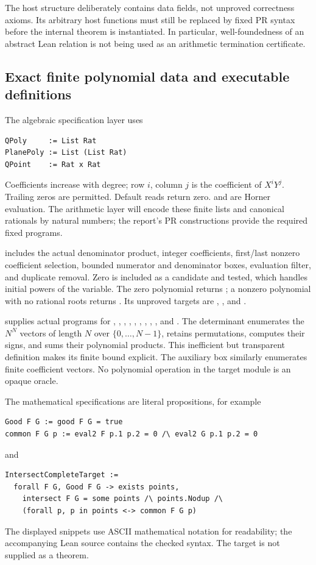 The host  structure deliberately contains data fields,
not unproved correctness axioms. Its arbitrary host functions must
still be replaced by fixed PR syntax before the internal theorem is
instantiated. In particular, well-foundedness of an abstract Lean
relation is not being used as an arithmetic termination certificate.

\subsection{Exact finite polynomial data and executable definitions}

The algebraic specification layer uses
\begin{lstlisting}
QPoly     := List Rat
PlanePoly := List (List Rat)
QPoint    := Rat x Rat
\end{lstlisting}
Coefficients increase with degree; row \(i\), column \(j\) is the
coefficient of \(X^iY^j\). Trailing zeros are permitted. Default reads
return zero.  and  are Horner evaluation.
The arithmetic layer will encode these finite lists and canonical
rationals by natural numbers; the report's PR constructions provide
the required fixed programs.

 includes the actual denominator product,
integer coefficients, first/last nonzero coefficient selection,
bounded numerator and denominator boxes, evaluation filter, and
duplicate removal. Zero is included as a candidate and tested, which
handles initial powers of the variable. The zero polynomial returns
; a nonzero polynomial with no rational roots returns
. Its unproved targets are
, , and
.

 supplies actual programs for
, , ,
, , ,
, , , and
. The determinant enumerates the \(N^N\) vectors
of length \(N\) over \(\{0,\ldots,N-1\}\), retains permutations,
computes their signs, and sums their polynomial products. This
inefficient but transparent definition makes its finite bound explicit.
The auxiliary box similarly enumerates finite coefficient vectors.
No polynomial operation in the target module is an opaque oracle.

The mathematical specifications are literal propositions, for example
\begin{lstlisting}
Good F G := good F G = true
common F G p := eval2 F p.1 p.2 = 0 /\ eval2 G p.1 p.2 = 0
\end{lstlisting}
and
\begin{lstlisting}
IntersectCompleteTarget :=
  forall F G, Good F G -> exists points,
    intersect F G = some points /\ points.Nodup /\
    (forall p, p in points <-> common F G p)
\end{lstlisting}
The displayed snippets use ASCII mathematical notation for readability;
the accompanying Lean source contains the checked syntax. The target is
not supplied as a theorem.

